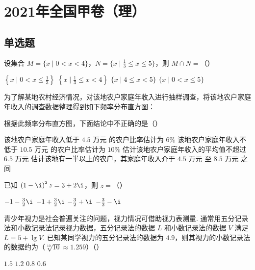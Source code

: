 
\chapter{2021年全国甲卷（理）}

\section{单选题}

\begin{problem}
设集合 \(M=\{x\mid 0<x<4\}\)，\(N=\{x\mid \frac{1}{3}\le x\le 5\}\)，则 \(M\cap N=\)（\quad）

\choices
    {\(\left\{x\mid 0<x\le \frac{1}{3}\right\}\)}
    {\(\left\{x\mid \frac{1}{3}\le x<4\right\}\)}
    {\(\{x\mid 4\le x<5\}\)}
    {\(\{x\mid 0<x\le 5\}\)}

\end{problem}

\begin{problem}
为了解某地农村经济情况，对该地农户家庭年收入进行抽样调查，将该地农户家庭年收入的调查数据整理得到如下频率分布直方图：


根据此频率分布直方图，下面结论中不正确的是（\quad）

\choices
    {该地农户家庭年收入低于 \(4.5\text{ 万元}\) 的农户比率估计为 \(6\%\)}
    {该地农户家庭年收入不低于 \(10.5\text{ 万元}\) 的农户比率估计为 \(10\%\)}
    {估计该地农户家庭年收入的平均值不超过 \(6.5\) 万元}
    {估计该地有一半以上的农户，其家庭年收入介于 \(4.5\text{ 万元}\) 至 \(8.5\text{ 万元}\) 之间}

\end{problem}

\begin{problem}
已知 \(\left(1-\i\right)^2z=3+2\i\)，则 \(z=\)（\quad）

\choices
    {\(-1-\frac{3}{2}\i\)}
    {\(-1+\frac{3}{2}\i\)}
    {\(-\frac{3}{2}+\i\)}
    {\(-\frac{3}{2}-\i\)}

\end{problem}

\begin{problem}
青少年视力是社会普遍关注的问题，视力情况可借助视力表测量. 通常用五分记录法和小数记录法记录视力数据，五分记录法的数据 \(L\) 和小数记录法的数据 \(V\) 满足 \(L=5+\lg V\). 已知某同学视力的五分记录法的数据为 \(4.9\)，则其视力的小数记录法的数据约为（\(\sqrt[10]{10}\approx 1.259\)）（\quad）

\choices
    {\(1.5\)}
    {\(1.2\)}
    {\(0.8\)}
    {\(0.6\)}

\end{problem}

